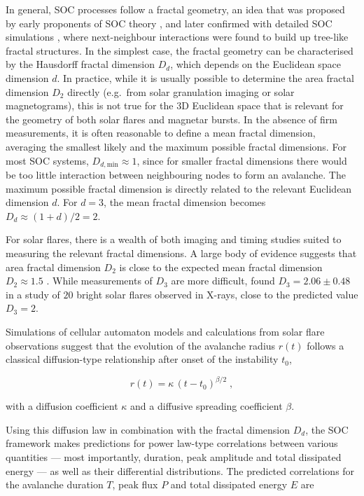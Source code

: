 \documentclass[12pt]{emulateapj}
\begin{document}
In general, SOC processes follow a fractal geometry, an idea that was proposed by early proponents of SOC theory \citep{bak1989}, and later
confirmed with detailed SOC simulations \citep{aschwanden2012a}, where next-neighbour interactions were found to build up tree-like fractal structures. In the simplest case,
the fractal geometry can be characterised by the Hausdorff fractal dimension $D_d$, which depends on the Euclidean space
dimension $d$. In practice, while it is usually possible to determine the area fractal dimension $D_2$ directly (e.g.\ from solar granulation imaging or solar
magnetograms), this is not true for the $3$D Euclidean space that is relevant for the geometry of both solar flares and magnetar bursts. 
In the absence of firm measurements, it is often reasonable to define a mean fractal dimension, averaging the smallest likely and the maximum possible fractal dimensions.
For most SOC systems, $D_{d,\mathrm{min}} \approx 1$, since for smaller fractal dimensions there would be too little interaction between neighbouring nodes to form an avalanche.
The maximum possible fractal dimension is directly related to the relevant Euclidean dimension $d$. For $d=3$, the mean fractal dimension becomes $D_d \approx (1+d)/2 = 2$. 

For solar flares, there is a wealth of both imaging and timing studies suited to measuring the relevant fractal dimensions. A large body of evidence suggests that area fractal dimension $D_2$ is
close to the expected mean fractal dimension $D_2 \approx 1.5$ \citep[see Table 8 in ][ and references therein]{aschwanden2014}. 
While measurements of $D_3$ are more difficult, \citet{aschwanden2008} found $D_3 = 2.06 \pm 0.48$
in a study of $20$ bright solar flares observed in X-rays, close to the predicted value $D_3 = 2$. 

Simulations of cellular automaton models \citep{aschwanden2012a} and calculations from solar flare observations \citep{aschwanden2012b,aschwanden2013a,aschwanden2013b} 
suggest that the evolution of the avalanche radius $r(t)$ follows a classical diffusion-type relationship after onset of the instability $t_0$, 

\begin{equation}
r(t) = \kappa\,(t- t_0)^{\beta/2}\; ,
\end{equation}

with a diffusion coefficient $\kappa$ and a diffusive spreading coefficient $\beta$.

Using this diffusion law in combination with the fractal dimension $D_d$, the SOC framework makes predictions for 
power law-type correlations between various quantities --- most importantly, duration, 
peak amplitude and total dissipated energy ---  as well as their differential distributions.
The predicted correlations for the avalanche duration $T$, peak flux $P$ and total dissipated energy $E$ are
\end{document}
